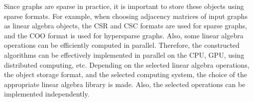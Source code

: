 Since graphs are sparse in practice, it is important to store these objects using sparse formats. For example, when choosing adjacency matrices of input graphs as linear algebra objects, the CSR and CSC formats are used for sparse graphs, and the COO format is used for hypersparse graphs. Also, some linear algebra operations can be efficiently computed in parallel. Therefore, the constructed algorithms can be effectively implemented in parallel on the CPU, GPU, using distributed computing, etc. Depending on the selected linear algebra operations, the object storage format, and the selected computing system, the choice of the appropriate linear algebra library is made. Also, the selected operations can be implemented independently.




